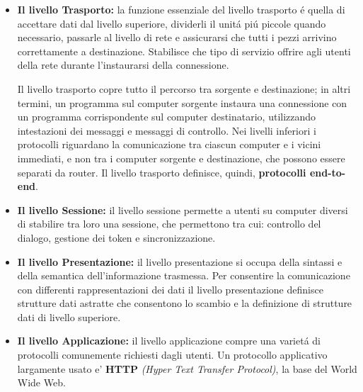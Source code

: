 \documentclass[12pt]{article}
\begin{document}
\begin{itemize}
    Quando un pacchetto deve viaggiare da una rete all'altra per arrivare a destinazione possono nascere dei problemi: 
    indirizzamento, rifiuto del pacchetto perch\'e troppo grande, protocolli diversi ecc. \'E compito del livello di rete 
    risolvere questi problemi per consentire la comunicazione tra reti diverse.
    
    \clearpage
    \item \textbf{Il livello Trasporto:} la funzione essenziale del livello trasporto \'e quella di accettare dati dal livello 
    superiore, dividerli il unit\'a pi\'u piccole quando necessario, passarle al livello di rete e assicurarsi che tutti i pezzi 
    arrivino correttamente a destinazione. Stabilisce che tipo di servizio offrire agli utenti della rete durante l'instaurarsi della 
    connessione. 
    
    Il livello trasporto copre tutto il percorso tra sorgente e destinazione; in 
    altri termini, un programma sul computer sorgente instaura una connessione con un programma corrispondente sul computer 
    destinatario, utilizzando intestazioni dei messaggi e messaggi di controllo. Nei livelli inferiori i protocolli riguardano la 
    comunicazione tra ciascun computer e i vicini immediati, e non tra i computer sorgente e destinazione, che possono essere 
    separati da router. Il livello trasporto definisce, quindi, \textbf{protocolli end-to-end}.
    
    \item \textbf{Il livello Sessione:} il livello sessione permette a utenti su computer diversi di stabilire tra loro una 
    sessione, che permettono tra cui: controllo del dialogo, gestione dei token e sincronizzazione.
    
    \item \textbf{Il livello Presentazione:} il livello presentazione si occupa della sintassi e della semantica dell'informazione 
    trasmessa. Per consentire la comunicazione con differenti rappresentazioni dei dati il livello presentazione definisce strutture 
    dati astratte che consentono lo scambio e la definizione di strutture dati di livello superiore.
    
    \item \textbf{Il livello Applicazione:} il livello applicazione compre una variet\'a di protocolli comunemente richiesti dagli 
    utenti. Un protocollo applicativo largamente usato e' \textbf{HTTP} \textit{(Hyper Text Transfer Protocol)}, la base del World 
    Wide Web.    
\end{itemize}
\end{document}
